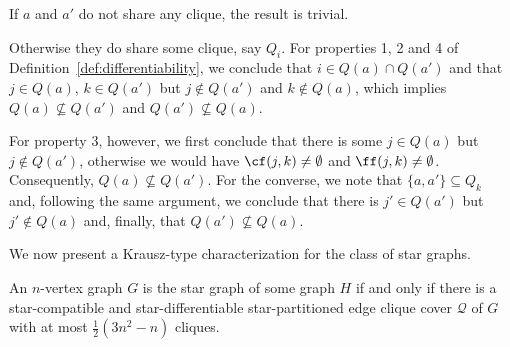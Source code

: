 \begin{tproof}
    If $a$ and $a'$ do not share any clique, the result is trivial.
    
    Otherwise they do share some clique, say $Q_i$.
    For properties 1, 2 and 4 of Definition~\ref{def:differentiability}, we conclude that $i \in Q(a) \cap Q(a')$ and that $j \in Q(a)$, $k \in Q(a')$ but $j \notin Q(a')$ and $k \notin Q(a)$, which implies $Q(a) \nsubseteq Q(a')$ and $Q(a') \nsubseteq Q(a)$.
    
    For property 3, however, we first conclude that there is some $j \in Q(a)$ but $j \notin Q(a')$, otherwise we would have $\cf(j,k) \neq \emptyset$ and $\ff(j,k) \neq \emptyset$.
    Consequently, $Q(a) \nsubseteq Q(a')$.
    For the converse, we note that $\{a, a'\} \subseteq Q_k$ and, following the same argument, we conclude that there is $j' \in Q(a')$ but $j' \notin Q(a)$ and, finally, that $Q(a') \nsubseteq Q(a)$.
\end{tproof}

We now present a Krausz-type characterization for the class of star graphs.

\begin{theorem}
    \label{thm:star_characterization}
    An $n$-vertex graph $G$ is the star graph of some graph $H$ if and only if there is a star-compatible and star-differentiable star-partitioned edge clique cover $\mathcal{Q}$ of $G$ with at most $\frac{1}{2}(3n^2 - n)$ cliques.
\end{theorem}

